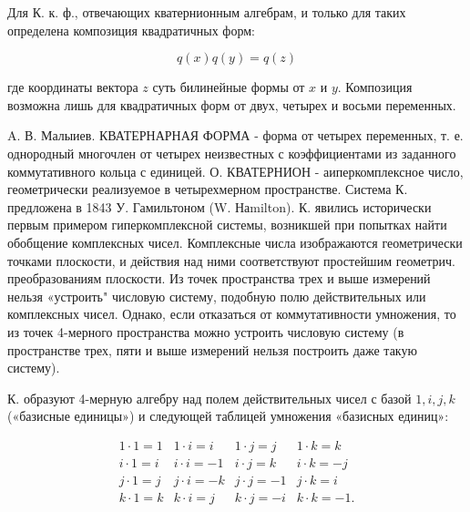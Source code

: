 \documentclass[10pt]{article}
\begin{document}
Для К. к. ф., отвечающих кватернионным алгебрам, и только для таких определена композиция квадратичных форм:



\[

q(x) q(y)=q(z)

\]



где координаты вектора $z$ суть билинейные формы от $x$ и $y$. Композиция возможна лишь для квадратичных форм от двух, четырех и восьми переменных.



A. В. Малыиев. КВАТЕРНАРНАЯ ФОРМА - форма от четырех переменных, т. е. однородный многочлен от четырех неизвестных с коэффициентами из заданного коммутативного кольца с единицей. $О$. КВАТЕРНИОН - аиперкомплексное число, геометрически реализуемое в четырехмерном пространстве. Система К. предложена в 1843 У. Гамильтоном (W. Наmilton). К. явились исторически первым примером гиперкомплексной системы, возникшей при попытках найти обобщение комплексных чисел. Комплексные числа изображаются геометрически точками плоскости, и действия над ними соответствуют простейшим геометрич. преобразованиям плоскости. Из точек пространства трех и выше измерений нельзя «устроить" числовую систему, подобную полю действительных или комплексных чисел. Однако, если отказаться от коммутативности умножения, то из точек 4-мерного пространства можно устроить числовую систему (в пространстве трех, пяти и выше измерений нельзя построить даже такую систему).



К. образуют 4-мерную алгебру над полем действительных чисел с базой $1, i, j, k$ («базисные единицы») и следующей таблицей умножения «базисных единиц»:



\[

\begin{array}{llll}

1 \cdot 1=1 & 1 \cdot i=i & 1 \cdot j=j & 1 \cdot k=k \\

i \cdot 1=i & i \cdot i=-1 & i \cdot j=k & i \cdot k=-j \\

j \cdot 1=j & j \cdot i=-k & j \cdot j=-1 & j \cdot k=i \\

k \cdot 1=k & k \cdot i=j & k \cdot j=-i & k \cdot k=-1 .

\end{array}

\]
\end{document}
